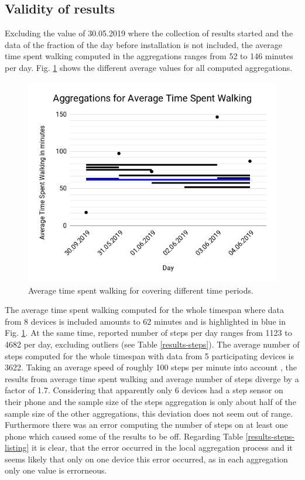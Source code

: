 \subsection{Validity of results}
Excluding the value of 30.05.2019 where the collection of results started and the data of the fraction of the day before installation is not included, the average time spent walking computed in the aggregations ranges from 52 to 146 minutes per day. Fig. \ref{time-walking-diagram} shows the different average values for all computed aggregations. 

\begin{figure}[h!]
	\includegraphics[width=\textwidth]{data/diagrams/average-time-walking2.png}
	\caption{Average time spent walking for covering different time periods.}
	\label{time-walking-diagram}
\end{figure}

The average time spent walking computed for the whole timespan where data from 8 devices is included amounts to 62 minutes and is highlighted in blue in Fig. \ref{time-walking-diagram}. At the same time, reported number of steps per day ranges from 1123 to 4682 per day, excluding outliers (see Table \ref{results-steps}). The average number of steps computed for the whole timespan with data from 5 participating devices is 3622. Taking an average speed of roughly 100 steps per minute into account \parencite{steps2}, the results from average time spent walking and average number of steps diverge by a factor of 1.7. Considering that apparently only 6 devices had a step sensor on their phone and the sample size of the steps aggregation is only about half of the sample size of the other aggregations, this deviation does not seem out of range. Furthermore there was an error computing the number of steps on at least one phone which caused some of the results to be off. Regarding Table \ref{results-steps-listing} it is clear, that the error occurred in the local aggregation process and it seems likely that only on one device this error occurred, as in each aggregation only one value is errorneous.

